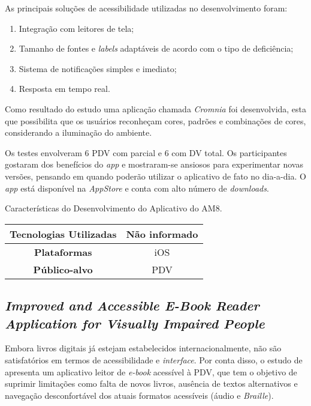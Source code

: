 As principais soluções de acessibilidade utilizadas no desenvolvimento foram:

\begin{enumerate}
  \item Integração com leitores de tela;
  \item Tamanho de fontes e \emph{labels} adaptáveis de acordo com o tipo de deficiência;
  \item Sistema de notificações simples e imediato;
  \item Resposta em tempo real.
\end{enumerate}

Como resultado do estudo uma aplicação chamada \emph{Cromnia} foi desenvolvida, esta que possibilita que os usuários reconheçam
cores, padrões e combinações de cores, considerando a iluminação do ambiente.

Os testes envolveram 6 PDV com parcial e 6 com DV total.
Os participantes gostaram dos benefícios do \emph{app} e mostraram-se ansiosos para experimentar novas versões, pensando em quando poderão utilizar o aplicativo de fato no dia-a-dia.
O \emph{app} está disponível na \emph{AppStore} e conta com alto número de \emph{downloads}.

\begin{quadro}[htb!]
  \caption{\label{qua-car-am8}Características do Desenvolvimento do Aplicativo do AM8.}
  \begin{tabular}{|c|c|}
    \hline
    \textbf{Tecnologias Utilizadas} & Não informado \\ \hline
    \textbf{Plataformas}            & iOS           \\ \hline
    \textbf{Público-alvo}           & PDV           \\
    \hline
  \end{tabular}
\end{quadro}

\subsection{\emph{Improved and Accessible E-Book Reader Application for Visually Impaired People}}

Embora livros digitais já estejam estabelecidos internacionalmente, não são satisfatórios em termos de acessibilidade e \emph{interface}.
Por conta disso, o estudo de  apresenta um aplicativo leitor de \emph{e-book} acessível à PDV, que tem o objetivo
de suprimir limitações como falta de novos livros, ausência de textos alternativos e navegação desconfortável dos atuais formatos
acessíveis (áudio e \emph{Braille}).

